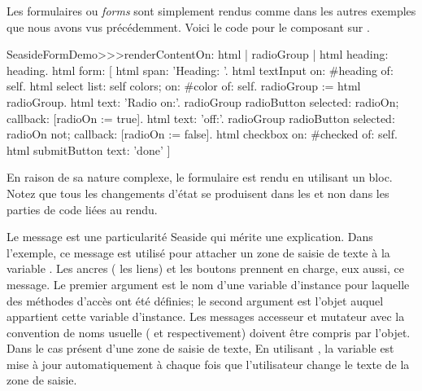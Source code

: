 \documentclass[a4paper,10pt,twoside]{book}
\begin{document}
Les formulaires ou \emph{forms} sont simplement rendus comme dans les
autres exemples que nous avons vus précédemment.
Voici le code pour le composant  sur
.


\begin{code}{} %
SeasideFormDemo>>>renderContentOn: html
	| radioGroup |
	html heading: heading.
	html form: [
		html span: 'Heading: '.
		html textInput on: #heading of: self.
		html select
			list: self colors;
			on: #color of: self.
		radioGroup := html radioGroup.
		html text: 'Radio on:'.
		radioGroup radioButton
			selected: radioOn;
			callback: [radioOn := true].
		html text: 'off:'.
		radioGroup radioButton
			selected: radioOn not;
			callback: [radioOn := false].
		html checkbox on: #checked of: self.
		html submitButton
			text: 'done' ]
\end{code}{}

En raison de sa nature complexe, le formulaire est rendu en utilisant
un bloc.
Notez que tous les changements d'état se produisent dans les
\callbacks et non dans les parties de code liées au rendu.

Le message  est une particularité Seaside
qui mérite une explication.
Dans l'exemple, ce message est utilisé pour attacher un zone de saisie
de texte à la variable .
Les ancres (\ie{} les liens) et les boutons prennent en charge, eux
aussi, ce message.
Le premier argument est le nom d'une variable d'instance pour laquelle
des méthodes d'accès
ont été définies; le second argument est l'objet auquel appartient
cette variable d'instance.
Les messages accesseur et mutateur avec la convention de noms usuelle
(\ie{}  et  respectivement) 
doivent être compris par l'objet.
Dans le cas présent d'une zone de saisie de texte, 
En utilisant , la variable  est
mise à jour automatiquement à chaque fois que l'utilisateur change le
texte de la zone de saisie.
\end{document}
